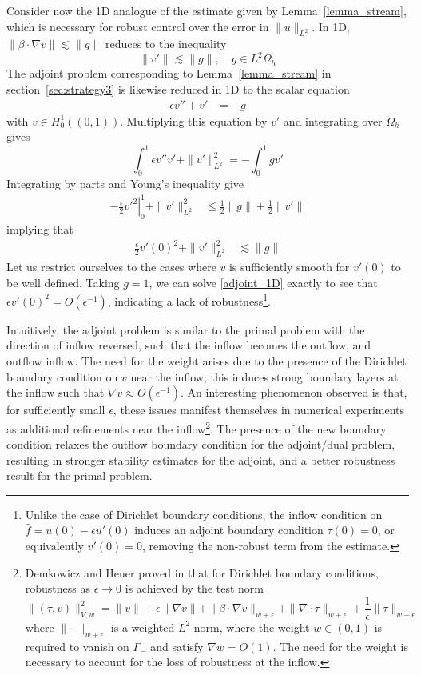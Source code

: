 \documentclass[11pt,onecolumn]{scrartcl}
\newcommand{\grad}{\nabla}
\renewcommand{\div}{\grad \cdot}
\begin{document}
Consider now the 1D analogue of the estimate given by Lemma~\ref{lemma_stream}, which is necessary for robust control over the error in $\|u\|_{L^2}$.  In 1D, $\|\beta\cdot\grad v\| \lesssim \|g\|$ reduces to the inequality 
\[
\|v'\|\lesssim \|g\|, \quad g\in L^2{\Omega_h}
\]
The adjoint problem corresponding to Lemma~\ref{lemma_stream} in section~\ref{sec:strategy3} is likewise reduced in 1D to the scalar equation
\begin{align}
\epsilon v'' + v' &= -g \label{adjoint_1D}
\end{align}
with $v\in H^1_0\left((0,1)\right)$.  Multiplying this equation by $v'$ and integrating over $\Omega_h$ gives
\[
\int_0^1 \epsilon v''v' + \|v'\|_{L^2}^2 = -\int_0^1 g v'
\]
Integrating by parts and Young's inequality give
\begin{align*}
-\left.\frac{\epsilon}{2} v'^2\right|_0^1 + \|v'\|_{L^2}^2 &\leq \frac{1}{2}\|g\| + \frac{1}{2}\|v'\|
\end{align*}
implying that
\begin{align*}
\frac{\epsilon}{2} v'(0)^2 + \|v'\|_{L^2}^2 & \lesssim \|g\| 
\end{align*}
Let us restrict ourselves to the cases where $v$ is sufficiently smooth for $v'(0)$ to be well defined.  Taking $g=1$, we can solve \eqref{adjoint_1D} exactly to see that $\epsilon v'(0)^2 = O(\epsilon^{-1})$, indicating a lack of robustness\footnote{Unlike the case of Dirichlet boundary conditions, the inflow condition on $ \widehat{f} = u(0)-\epsilon u'(0)$ induces an adjoint boundary condition $\tau(0)=0$, or equivalently $v'(0) = 0$, removing the non-robust term from the estimate.}.

Intuitively, the adjoint problem is similar to the primal problem with the direction of inflow reversed, such that the inflow becomes the outflow, and outflow inflow.  The need for the weight arises due to the presence of the Dirichlet boundary condition on $v$ near the inflow; this induces strong boundary layers at the inflow such that $\grad v \approx O(\epsilon^{-1})$. An interesting phenomenon observed is that, for sufficiently small $\epsilon$, these issues manifest themselves in numerical experiments as additional refinements near the inflow\footnote{Demkowicz and Heuer proved in \cite{DPGrobustness} that for Dirichlet boundary conditions, robustness as $\epsilon \rightarrow 0$ is achieved by the test norm
\[
\|\left(\tau, v\right)\|_{V,w}^2 = \|v\| + \epsilon \|\grad v\| + \|\beta \cdot \grad v\|_{w+\epsilon} + \| \div \tau\|_{w+\epsilon} + \frac{1}{\epsilon}\|\tau\|_{w+\epsilon}
\]
where $\|\cdot \|_{w+\epsilon}$ is a weighted $L^2$ norm, where the weight $w \in (0,1)$ is required to vanish on $\Gamma_-$ and satisfy $\grad w = O(1)$. The need for the weight is necessary to account for the loss of robustness at the inflow.}.  The presence of the new boundary condition relaxes the outflow boundary condition for the adjoint/dual problem, resulting in stronger stability estimates for the adjoint, and a better robustness result for the primal problem.  
\end{document}
